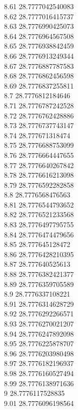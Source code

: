 {8.61	28.7777042540083\\
8.62	28.7777016415737\\
8.63	28.7776990425073\\
8.64	28.7776964567508\\
8.65	28.7776938842459\\
8.66	28.7776913249344\\
8.67	28.7776887787583\\
8.68	28.7776862456598\\
8.69	28.7776837255811\\
8.7	28.7776812184646\\
8.71	28.7776787242528\\
8.72	28.7776762428886\\
8.73	28.7776737743147\\
8.74	28.777671318474\\
8.75	28.7776688753099\\
8.76	28.7776664447655\\
8.77	28.7776640267842\\
8.78	28.7776616213098\\
8.79	28.7776592282858\\
8.8	28.7776568476563\\
8.81	28.7776544793652\\
8.82	28.7776521233568\\
8.83	28.7776497795755\\
8.84	28.7776474479656\\
8.85	28.777645128472\\
8.86	28.7776428210395\\
8.87	28.777640525613\\
8.88	28.7776382421377\\
8.89	28.7776359705589\\
8.9	28.7776337108221\\
8.91	28.7776314628729\\
8.92	28.7776292266571\\
8.93	28.7776270021207\\
8.94	28.7776247892098\\
8.95	28.7776225878707\\
8.96	28.7776203980498\\
8.97	28.7776182196937\\
8.98	28.7776160527494\\
8.99	28.7776138971636\\
9	28.7776117528835\\
9.01	28.7776096198564\\
}
